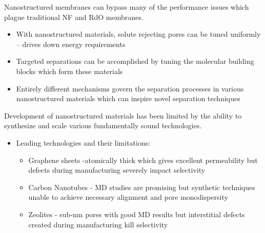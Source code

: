\documentclass{article}
\begin{document}
	Nanostructured membranes can bypass many of the performance issues which plague traditional NF and RdO membranes.
	\begin{itemize}
		\item With nanostructured materials, solute rejecting pores can be tuned uniformly -- drives down energy requirements
		\item Targeted separations can be accomplished by tuning the molecular building blocks which form these materials
		\item Entirely different mechanisms govern the separation processes in various nanostructured materials which can inspire novel separation techniques
	\end{itemize}
	
	Development of nanostructured materials has been limited by the ability to synthesize and scale various fundamentally sound technologies.
	\begin{itemize}
		\item Leading technologies and their limitations:
		\begin{itemize}
			\item Graphene sheets -atomically thick which gives excellent permeability but defects during manufacturing severely impact selectivity
			\item Carbon Nanotubes - MD studies are promising but synthetic techniques unable to achieve necessary alignment and pore monodispersity
			\item Zeolites - sub-nm pores with good MD results but interstitial defects created during manufacturing kill selectivity 
		\end{itemize}
	\end{itemize}
	  
\end{document}
